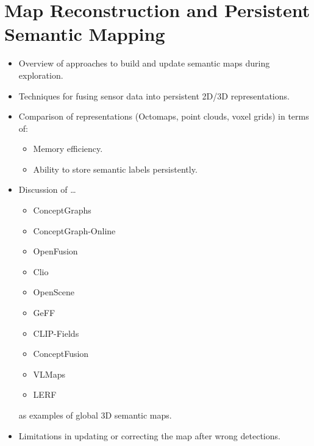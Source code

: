 \section{Map Reconstruction and Persistent Semantic Mapping}
\begin{itemize}
    \item Overview of approaches to build and update semantic maps during exploration.
    \item Techniques for fusing sensor data into persistent 2D/3D representations.
    \item Comparison of representations (Octomaps, point clouds, voxel grids) in terms of:
    \begin{itemize}
        \item Memory efficiency.
        \item Ability to store semantic labels persistently.
    \end{itemize}
    \item Discussion of \dots
    \begin{itemize}
        \item ConceptGraphs
        \item ConceptGraph-Online
        \item OpenFusion
        \item Clio
        \item OpenScene
        \item GeFF
        \item CLIP-Fields
        \item ConceptFusion
        \item VLMaps
        \item LERF
    \end{itemize}
    as examples of global 3D semantic maps.
    \item Limitations in updating or correcting the map after wrong detections.
\end{itemize}

